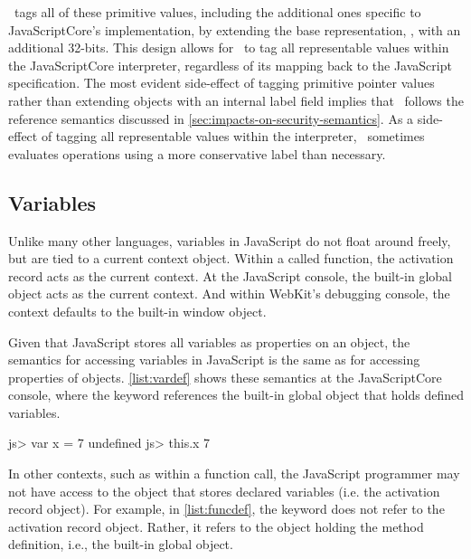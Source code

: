 \FlowCore\ tags all of these primitive values, including the additional ones specific to JavaScriptCore's implementation, by extending the base representation, , with an additional 32-bits.
This design allows for \FlowCore\ to tag all representable values within the JavaScriptCore interpreter, regardless of its mapping back to the JavaScript specification.
The most evident side-effect of tagging primitive pointer values rather than extending objects with an internal label field implies that \FlowCore\ follows the reference semantics discussed in \autoref{sec:impacts-on-security-semantics}.
As a side-effect of tagging all representable values within the interpreter, \FlowCore\ sometimes evaluates operations using a more conservative label than necessary.

\subsection{Variables}
\label{sec:variables}

Unlike many other languages, variables in JavaScript do not float around freely, but are tied to a current context object.
Within a called function, the activation record acts as the current context.
At the JavaScript console, the built-in global object acts as the current context.
And within WebKit's debugging console, the context defaults to the built-in window object.

Given that JavaScript stores all variables as properties on an object, the semantics for accessing variables in JavaScript is the same as for accessing properties of objects.
\autoref{list:vardef} shows these semantics at the JavaScriptCore console, where the  keyword references the built-in global object that holds defined variables.

\begin{jscode}
js> var x = 7
undefined
js> this.x
7
\end{jscode}

In other contexts, such as within a function call, the JavaScript programmer may not have access to the object that stores declared variables (i.e. the activation record object).
For example, in \autoref{list:funcdef}, the  keyword does not refer to the activation record object.
Rather, it refers to the object holding the method definition, i.e., the built-in global object.


